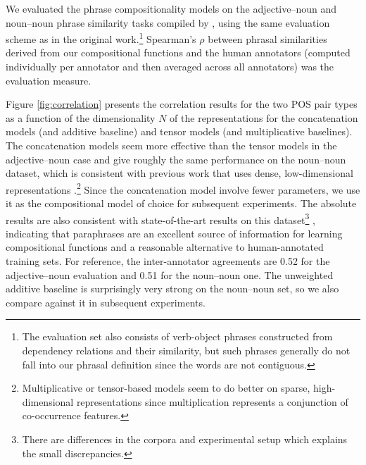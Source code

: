 \documentclass[11pt]{article}
\begin{document}
We evaluated the phrase compositionality models on the adjective--noun and noun--noun phrase similarity tasks compiled by , using the same evaluation scheme as in the original work.\footnote{The evaluation set also consists of verb-object phrases constructed from dependency relations and their similarity, but such phrases generally do not fall into our phrasal definition since the words are not contiguous.}
Spearman's $\rho$ between phrasal similarities derived from our compositional functions and the human annotators (computed individually per annotator and then averaged across all annotators) was the evaluation measure. 

Figure \ref{fig:correlation} presents the correlation results for the two POS pair types as a function of the dimensionality $N$ of the representations for the concatenation models (and additive baseline) and tensor models (and multiplicative baselines). 
The concatenation models seem more effective than the tensor models in the adjective--noun case and give roughly the same performance on the noun--noun dataset, which is consistent with previous work that uses dense, low-dimensional representations \cite{Guevara2011,Hermann2013,Hashimoto2014}.\footnote{Multiplicative or tensor-based models seem to do better on sparse, high-dimensional representations \cite{Mitchell2010,Baroni2010} since multiplication represents a conjunction of co-occurrence features.}
Since the concatenation model involve fewer parameters, we use it as the compositional model of choice for subsequent experiments. 
The absolute results are also consistent with state-of-the-art results on this dataset\footnote{There are differences in the corpora and experimental setup which explains the small discrepancies.} \cite{Blacoe2012,Hashimoto2014}, indicating that paraphrases are an excellent source of information for learning compositional functions and a reasonable alternative to human-annotated training sets. 
For reference, the inter-annotator agreements are 0.52 for the adjective--noun evaluation and 0.51 for the noun--noun one. 
The unweighted additive baseline is surprisingly very strong on the noun--noun set, so we also compare against it in subsequent experiments. 

\end{document}
